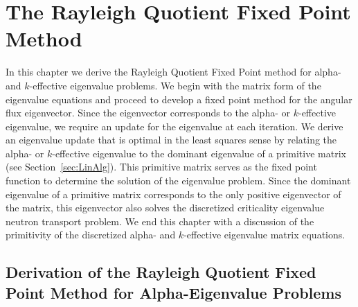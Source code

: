 \chapter{The Rayleigh Quotient Fixed Point Method}
\label{DeriveRQ}

In this chapter we derive the Rayleigh Quotient Fixed Point method for alpha- and $k$-effective eigenvalue problems. We begin with the matrix form of the eigenvalue equations and proceed to develop a fixed point method for the angular flux eigenvector. Since the eigenvector corresponds to the alpha- or $k$-effective eigenvalue, we require an update for the eigenvalue at each iteration. We derive an eigenvalue update that is optimal in the least squares sense by relating the alpha- or $k$-effective eigenvalue to the dominant eigenvalue of a primitive matrix (see Section~\ref{sec:LinAlg}). This primitive matrix serves as the fixed point function to determine the solution of the eigenvalue problem. Since the dominant eigenvalue of a primitive matrix corresponds to the only positive eigenvector of the matrix, this eigenvector also solves the discretized criticality eigenvalue neutron transport problem. We end this chapter with a discussion of the primitivity of the discretized alpha- and $k$-effective eigenvalue matrix equations.

\section{Derivation of the Rayleigh Quotient Fixed Point \newline Method for Alpha-Eigenvalue Problems}

